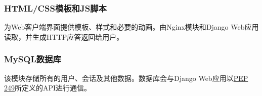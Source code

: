 \subsubsection{HTML/CSS模板和JS脚本}
为Web客户端界面提供模板、样式和必要的动画。由Nginx模块和Django Web应用读取，并生成HTTP应答返回给用户。

\subsubsection{MySQL数据库}
该模块存储所有的用户、会话及其他数据。数据库会与Django Web应用以\href{https://www.python.org/dev/peps/pep-0249}{PEP 249}所定义的API进行通信。




